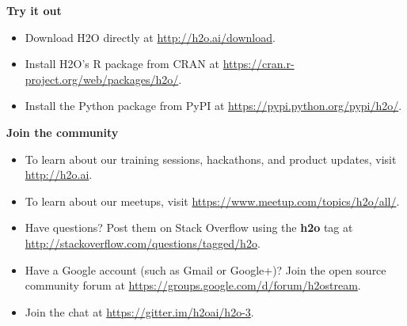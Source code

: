 \documentclass{standalone}
\begin{document}
\textbf{Try it out}

\begin{itemize}
\setlength\itemsep{1pt}
\item  Download H2O directly at {\url{http://h2o.ai/download}}.
\item Install H2O's R package from CRAN at {\url{https://cran.r-project.org/web/packages/h2o/}}. 
\item Install the Python package from PyPI at {\url{https://pypi.python.org/pypi/h2o/}}.

\end{itemize}


\begin{minipage}{\textwidth}
\textbf{Join the community}
\setlength{\parskip}{1em}
\begin{itemize}
\setlength\itemsep{1pt}
\item To learn about our training sessions, hackathons, and product updates, visit {\url{http://h2o.ai}}. 
\item To learn about our meetups, visit {\url{https://www.meetup.com/topics/h2o/all/}}.
\item Have questions? Post them on Stack Overflow using the \textbf{h2o} tag at {\url{http://stackoverflow.com/questions/tagged/h2o}}.
\item Have a Google account (such as Gmail or Google+)? Join the open source community forum at {\url{https://groups.google.com/d/forum/h2ostream}}.
\item Join the chat at {\url{https://gitter.im/h2oai/h2o-3}}.
\end{itemize}
\end{minipage}
\end{document}
